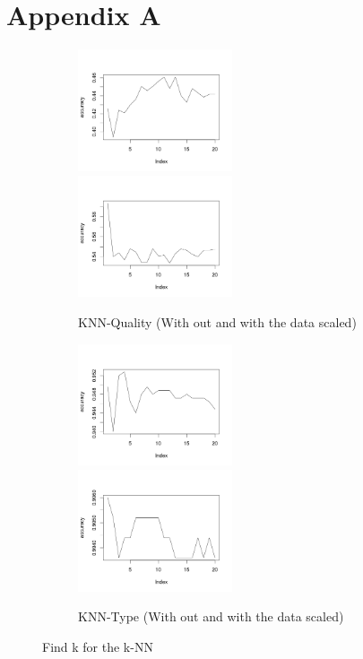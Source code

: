 \documentclass[twoside]{article}
\begin{document}
\section*{Appendix A}
\begin{figure}[H]
\centering
\begin{subfigure}[b]{\textwidth}
\includegraphics[width=0.5\textwidth]{img/KNN-Quality(Not-Scaled).png}
\includegraphics[width=0.5\textwidth]{img/KNN-Quality(Scaled).png}
\caption{KNN-Quality (With out and with the data scaled)}
\label{fig:KNN-Quality}
\end{subfigure}

\begin{subfigure}[b]{\textwidth}
\includegraphics[width=0.5\textwidth]{img/KNN-Type(Not-Scaled).png}
\includegraphics[width=0.5\textwidth]{img/KNN-Type(Scaled).png}
\caption{KNN-Type (With out and with the data scaled)}
\label{fig:KNN-TYPE}
\end{subfigure}


\caption{Find k for the k-NN}
\end{figure}



\end{document}
